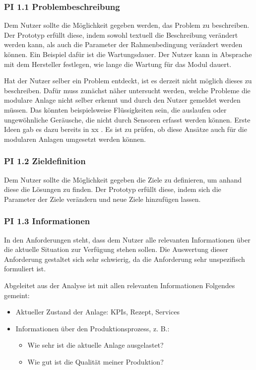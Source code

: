 \subsubsection*{PI 1.1 Problembeschreibung}
Dem Nutzer sollte die Möglichkeit gegeben werden, das Problem zu beschreiben. Der Prototyp erfüllt diese, indem sowohl textuell die Beschreibung verändert werden kann, als auch die Parameter der Rahmenbedingung verändert werden können. Ein Beispiel dafür ist die Wartungsdauer. Der Nutzer kann in Absprache mit dem Hersteller festlegen, wie lange die Wartung für das Modul dauert.

Hat der Nutzer selber ein Problem entdeckt, ist es derzeit nicht möglich dieses zu beschreiben. Dafür muss zunächst näher untersucht werden, welche Probleme die modulare Anlage nicht selber erkennt und durch den Nutzer gemeldet werden müssen. Das könnten beispielsweise Flüssigkeiten sein, die auslaufen oder ungewöhnliche Geräusche, die nicht durch Sensoren erfasst werden können. Erste Ideen gab es dazu bereits in xx . Es ist zu prüfen, ob diese Ansätze auch für die modularen Anlagen umgesetzt werden können.

\subsubsection*{PI 1.2 Zieldefinition}
Dem Nutzer sollte die Möglichkeit gegeben die Ziele zu definieren, um anhand diese die Lösungen zu finden. Der Prototyp erfüllt diese, indem sich die Parameter der Ziele verändern und neue Ziele hinzufügen lassen.

\subsubsection*{PI 1.3 Informationen}
In den Anforderungen steht, dass dem Nutzer alle relevanten Informationen über die aktuelle Situation zur Verfügung stehen sollen. Die Auswertung dieser Anforderung gestaltet sich sehr schwierig, da die Anforderung sehr unspezifisch formuliert ist.

Abgeleitet aus der Analyse ist mit allen relevanten Informationen Folgendes gemeint:
\begin{itemize}
\item Aktueller Zustand der Anlage: KPIs, Rezept, Services
\item Informationen über den Produktionsprozess, z. B.:
	\begin{itemize}
	\item Wie sehr ist die aktuelle Anlage ausgelastet?
	\item Wie gut ist die Qualität meiner Produktion?
\end{itemize}
\end{itemize}

